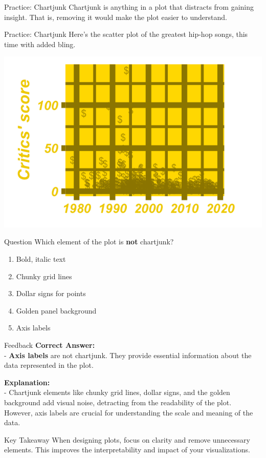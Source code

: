 \documentclass[
  ignorenonframetext,
]{beamer}
\providecommand{\tightlist}{%
  \setlength{\itemsep}{0pt}\setlength{\parskip}{0pt}}
\begin{document}
\begin{frame}{Practice: Chartjunk}
\label{practice-chartjunk}
Chartjunk is anything in a plot that distracts from gaining insight.
That is, removing it would make the plot easier to understand.
\end{frame}

\begin{frame}{Practice: Chartjunk}
\label{practice-chartjunk-1}
Here's the scatter plot of the greatest hip-hop songs, this time with
added bling.

\includegraphics{../images/im119.png}
\end{frame}

\begin{frame}{Question}
\label{question-9}
Which element of the plot is \textbf{not} chartjunk?

\begin{enumerate}
\tightlist
\item
  Bold, italic text\\
\item
  Chunky grid lines\\
\item
  Dollar signs for points\\
\item
  Golden panel background\\
\item
  Axis labels
\end{enumerate}
\end{frame}

\begin{frame}{Feedback}
\label{feedback}
\textbf{Correct Answer:}\\
- \textbf{Axis labels} are not chartjunk. They provide essential
information about the data represented in the plot.

\textbf{Explanation:}\\
- Chartjunk elements like chunky grid lines, dollar signs, and the
golden background add visual noise, detracting from the readability of
the plot. However, axis labels are crucial for understanding the scale
and meaning of the data.
\end{frame}

\begin{frame}{Key Takeaway}
\label{key-takeaway-2}
When designing plots, focus on clarity and remove unnecessary elements.
This improves the interpretability and impact of your visualizations.
\end{frame}
\end{document}
